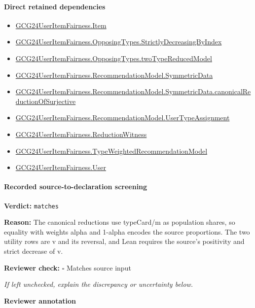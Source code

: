 \documentclass[10pt]{article}
\newcommand{\reviewerbox}{%
  \par\noindent\fbox{\parbox{0.96\linewidth}{\rule{0pt}{0.38in}}}\par
}
\newcommand{\reviewmatch}[1]{%
  \par\noindent\textbf{Reviewer check:} $\square$\; #1\par
  \noindent\emph{If left unchecked, explain the discrepancy or uncertainty below.}\par
}
\begin{document}
\paragraph{Direct retained dependencies}
\begin{itemize}\raggedright
\item \hyperlink{governing-declaration-a7c560a429c6e204}{GCG24\allowbreak{}User\allowbreak{}Item\allowbreak{}Fairness.\allowbreak{}Item}
\item \hyperlink{governing-declaration-8278344d2ddef9a8}{GCG24\allowbreak{}User\allowbreak{}Item\allowbreak{}Fairness.\allowbreak{}Opposing\allowbreak{}Types.\allowbreak{}Strictly\allowbreak{}Decreasing\allowbreak{}By\allowbreak{}Index}
\item \hyperlink{governing-declaration-b87168913e966e7f}{GCG24\allowbreak{}User\allowbreak{}Item\allowbreak{}Fairness.\allowbreak{}Opposing\allowbreak{}Types.\allowbreak{}two\allowbreak{}Type\allowbreak{}Reduced\allowbreak{}Model}
\item \hyperlink{governing-declaration-5bf2c3489c614d0a}{GCG24\allowbreak{}User\allowbreak{}Item\allowbreak{}Fairness.\allowbreak{}Recommendation\allowbreak{}Model.\allowbreak{}Symmetric\allowbreak{}Data}
\item \hyperlink{governing-declaration-74d9be2e84dd2134}{GCG24\allowbreak{}User\allowbreak{}Item\allowbreak{}Fairness.\allowbreak{}Recommendation\allowbreak{}Model.\allowbreak{}Symmetric\allowbreak{}Data.\allowbreak{}canonical\allowbreak{}Reduction\allowbreak{}Of\allowbreak{}Surjective}
\item \hyperlink{governing-declaration-ff90b1efab93f1aa}{GCG24\allowbreak{}User\allowbreak{}Item\allowbreak{}Fairness.\allowbreak{}Recommendation\allowbreak{}Model.\allowbreak{}User\allowbreak{}Type\allowbreak{}Assignment}
\item \hyperlink{governing-declaration-09e04866bceb3cdb}{GCG24\allowbreak{}User\allowbreak{}Item\allowbreak{}Fairness.\allowbreak{}Reduction\allowbreak{}Witness}
\item \hyperlink{governing-declaration-9d0d71ba8ee67837}{GCG24\allowbreak{}User\allowbreak{}Item\allowbreak{}Fairness.\allowbreak{}Type\allowbreak{}Weighted\allowbreak{}Recommendation\allowbreak{}Model}
\item \hyperlink{governing-declaration-800dd691bc989470}{GCG24\allowbreak{}User\allowbreak{}Item\allowbreak{}Fairness.\allowbreak{}User}
\end{itemize}
\paragraph{Recorded source-to-declaration screening}
\textbf{Verdict:} \texttt{matches}
\\
{\raggedright
\textbf{Reason:} The canonical reductions use typeCard/\allowbreak{}m as population shares, so equality with weights alpha and 1-\allowbreak{}alpha encodes the source proportions.\allowbreak{} The two utility rows are v and its reversal, and Lean requires the source's positivity and strict decrease of v.\allowbreak{}
\par}
\reviewmatch{Matches source input}
\noindent\textbf{Reviewer annotation}\par
\reviewerbox
\clearpage
\hypertarget{paper-prerequisite-57ab87149fe0d068}{}
\end{document}
